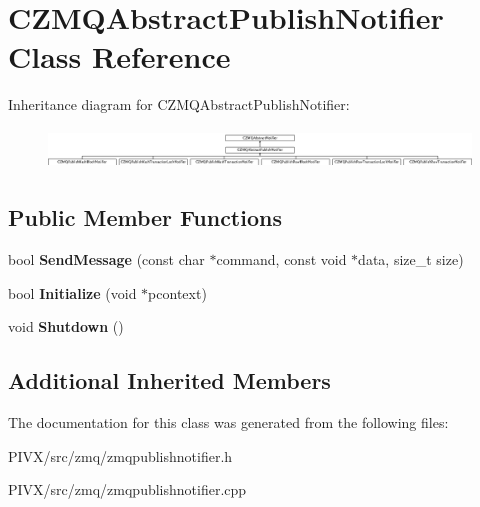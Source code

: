\hypertarget{class_c_z_m_q_abstract_publish_notifier}{}\section{C\+Z\+M\+Q\+Abstract\+Publish\+Notifier Class Reference}
\label{class_c_z_m_q_abstract_publish_notifier}
Inheritance diagram for C\+Z\+M\+Q\+Abstract\+Publish\+Notifier\+:\begin{figure}[H]
\begin{center}
\leavevmode
\includegraphics[height=1.064639cm]{class_c_z_m_q_abstract_publish_notifier}
\end{center}
\end{figure}
\subsection*{Public Member Functions}
\begin{DoxyCompactItemize}
\item 
\mbox{\label{class_c_z_m_q_abstract_publish_notifier_a1bec52cf2e0ef829bbd067cac11acfdd}} 
bool {\bfseries Send\+Message} (const char $\ast$command, const void $\ast$data, size\+\_\+t size)
\item 
\mbox{\label{class_c_z_m_q_abstract_publish_notifier_a73331e53a4ad4efb0ae26348c24ff8fa}} 
bool {\bfseries Initialize} (void $\ast$pcontext)
\item 
\mbox{\label{class_c_z_m_q_abstract_publish_notifier_a9f11ac193ff2a4a703817ba3e6c00836}} 
void {\bfseries Shutdown} ()
\end{DoxyCompactItemize}
\subsection*{Additional Inherited Members}


The documentation for this class was generated from the following files\+:\begin{DoxyCompactItemize}
\item 
P\+I\+V\+X/src/zmq/zmqpublishnotifier.\+h\item 
P\+I\+V\+X/src/zmq/zmqpublishnotifier.\+cpp\end{DoxyCompactItemize}
